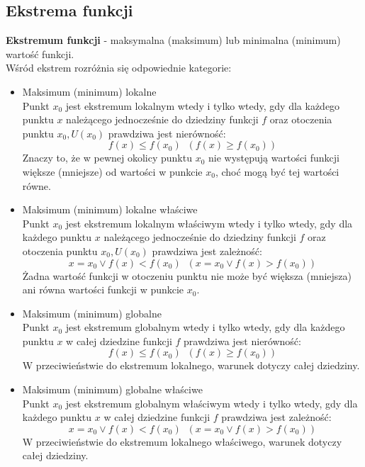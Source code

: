 \documentclass[14pt,a4paper]{extarticle}
\begin{document}
\subsection{Ekstrema funkcji}
\noindent\textbf{Ekstremum funkcji} - maksymalna (maksimum) lub minimalna (minimum) wartość funkcji.\\
Wśród ekstrem rozróżnia się odpowiednie kategorie:
\begin{itemize}
   \item Maksimum (minimum) lokalne\\
   Punkt $x_{0}$ jest ekstremum lokalnym wtedy i tylko wtedy, gdy dla każdego punktu $x$ należącego jednocześnie do dziedziny funkcji $f$ oraz otoczenia punktu $x_{0}, U(x_{0})$
   prawdziwa jest nierówność:
   $$f(x) \leq f(x_{0}) \;\; (f(x) \geq f(x_{0}))$$
   Znaczy to, że w pewnej okolicy punktu $x_{0}$ nie występują wartości funkcji większe 
   (mniejsze) od wartości w punkcie $x_{0}$, choć mogą być tej wartości równe.\\

   \item Maksimum (minimum) lokalne właściwe\\
   Punkt $x_{0}$ jest ekstremum lokalnym właściwym wtedy i tylko wtedy, gdy dla każdego punktu $x$ należącego jednocześnie do dziedziny funkcji $f$ oraz otoczenia punktu $x_{0}, U(x_{0})$
   prawdziwa jest zależność:
   $$x = x_{0} \lor f(x) < f(x_{0}) \;\; (x = x_{0} \lor f(x) > f(x_{0}))$$
   Żadna wartość funkcji w otoczeniu punktu nie może być większa (mniejsza) ani równa wartości funkcji
   w punkcie $x_{0}$.\\
   
   \item Maksimum (minimum) globalne\\
   Punkt $x_{0}$ jest ekstremum globalnym wtedy i tylko wtedy, gdy dla każdego punktu $x$ w całej dziedzine funkcji $f$ prawdziwa jest nierówność:
   $$f(x) \leq f(x_{0}) \;\; (f(x) \geq f(x_{0}))$$
   W przeciwieństwie do ekstremum lokalnego, warunek dotyczy całej dziedziny.\\

   \item Maksimum (minimum) globalne właściwe\\
   Punkt $x_{0}$ jest ekstremum globalnym właściwym wtedy i tylko wtedy, gdy dla każdego punktu $x$ w całej dziedzine funkcji $f$ prawdziwa jest zależność:
   $$x = x_{0} \lor f(x) < f(x_{0}) \;\; (x = x_{0} \lor f(x) > f(x_{0}))$$
   W przeciwieństwie do ekstremum lokalnego właściwego, warunek dotyczy całej dziedziny.\\
\end{itemize}
\end{document}
